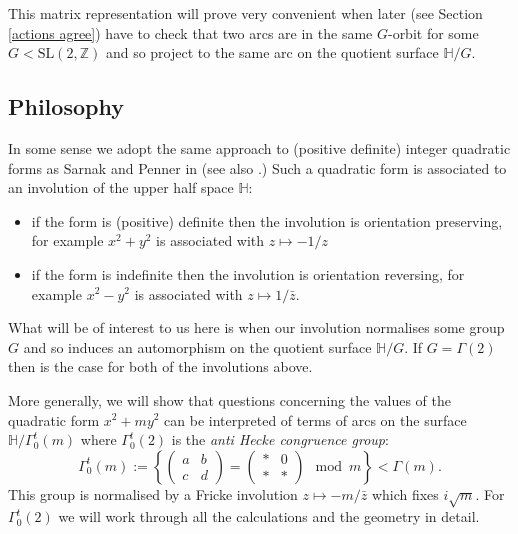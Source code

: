 \documentclass[12pt,a4paper]{amsart}
\def\ah{\Gamma_0^t(2)}
\def\ZZ{\mathbb{Z}}
\def\sl2{\mathrm{SL}(2, \ZZ)}
\begin{document}
This matrix representation will prove very convenient when later
(see Section \ref{actions agree})
have to check that two arcs are in the same $G$-orbit for some $G <
\sl2$ and so project to the same arc on the quotient surface
$\mathbb{H}/G$.

\subsection{Philosophy}


In some sense we adopt the same approach to (positive definite)
integer quadratic forms as Sarnak \cite{sarnak} and
Penner in \cite{bob} (see also \cite{springborn1}.)
Such a
quadratic form is associated to an involution of the upper half
space $\mathbb{H}$: 
\begin{itemize}
	\item if the form is (positive) definite then the
		involution is orientation preserving,
		for example  $x^2 + y^2$ is associated with $z\mapsto -1 / z$
	\item if the form is indefinite then the involution is
		orientation reversing, for example $x^2 - y^2$ is
		associated with $z\mapsto 1 / \bar{z}.$
\end{itemize}
What will be of interest to us here is
when our involution normalises some group $G$
and so induces an automorphism on the quotient surface
$\mathbb{H}/G$. If $G=\Gamma(2)$ then  is the case for both of the
involutions above.

More generally, we will show that questions concerning the values of the quadratic form $x^2
+ m y^2$ can be interpreted of terms of arcs on the surface
$\mathbb{H}/\Gamma^t_0(m)$ where
$\ah$ is the 
\textit{anti Hecke congruence group}:
$$ \Gamma^t_0(m) := \left \{ \begin{pmatrix} a & b \\ c & d \end{pmatrix} = 
\begin{pmatrix} * & 0 \\ * & * \end{pmatrix} \mod m \right \} <
\Gamma(m).$$
This group is 
normalised by a Fricke involution $z\mapsto -m / \bar{z}$
which fixes $i\sqrt{m}$.
For $\Gamma^t_0(2)$  we will work through all the calculations and
the geometry in detail.

\end{document}
